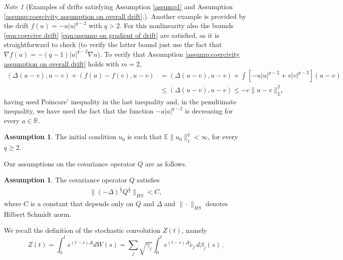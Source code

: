 \documentclass[reqno, 11pt]{amsart}
\theoremstyle{plain}
\theoremstyle{definition}
\newtheorem{assumption}[theorem]{Assumption}
\theoremstyle{remark}
\newtheorem{note}[theorem]{Note}
\numberwithin{equation}{section}
\numberwithin{theorem}{section}
\newcommand{\R}{\mathbb{R}}
\begin{document}
{\begin{note}[Examples of drifts satisfying Assumption \ref{assump1} and Assumption \ref{assump:coercivity assumption on overall drift}.]
Another example is provided by the drift  
$f(u)= -u |u|^{q-2} $ with $q> 2$. For this nonlinearity also the bounds \eqref{eqn:coercive drift} \eqref{eqn:assump on gradient of drift} are satisfied, as it is straightforward to check (to verify the latter bound just use the fact that $\nabla f(u) = - (q-1) |u|^{q-2} \nabla u$). To verify that  Assumption \ref{assump:coercivity assumption on overall drift} holds with $m=2$, 
\begin{align*}
    (\Delta(u-v), u-v) + (f(u)-f(v), u-v) & = (\Delta(u-v), u-v) 
    + \int [- u |u|^{p-2} + v |v|^{p-2}] (u-v)\\
    &\leq (\Delta(u-v), u-v) \leq -c \|u-v\|_{L^2}^2
\end{align*}
having used Poincare' inequality in the last inequality and, in the penultimate inequality, we have used the fact that the function $-a|a|^{q-2}$ is decreasing for every $a \in\R$. 
\end{note}



\begin{assumption}\label{assump3}
 The initial condition $u_0$ is such that 
$
\mathbb{E}\|u_0\|_{1}^q<\infty$,  for every  $q\geq 2.$
\end{assumption}

Our assumptions on the covariance operator  $Q$ are as follows. 
\begin{assumption}\label{assump2}
The covariance operator $Q$ satisfies
\begin{align}
\|(-\Delta)^{\frac{1}{2}}Q^{\frac{1}{2}}\|_{HS}<C,
\end{align}
where $C$ is a constant that depends only on $Q$ and $\Delta$ and $\| \cdot \|_{HS}$ denotes Hilbert Schmidt norm.  
\end{assumption}
We recall the definition of the stochastic convolution $Z(t)$, namely
$$
Z(t) = \int_0^t e^{(t-s) \Delta} dW(s) = \sum_j  \sqrt{\gamma_j} \int_0^t e^{(t-s) \Delta} \tilde e_j \,d\beta_j(s) \,.
$$

}
\end{document}
